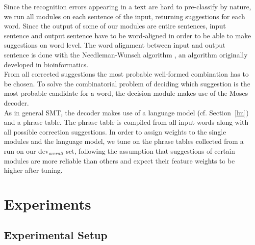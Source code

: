 \documentclass[11pt,letterpaper]{article}
\begin{document}
Since the recognition errors appearing in a text are hard to pre-classify by nature, we 
run all modules on each sentence of the input, returning suggestions for each word. 
Since the output of some of our modules are entire sentences, input sentence and output sentence 
have to be word-aligned in order to be able to make suggestions on word level. The word 
alignment between input and output sentence is done with the Needleman-Wunsch algorithm \cite{Needleman1970}, an algorithm originally developed in bioinformatics.\\
From all corrected suggestions the most probable well-formed combination has to be chosen. 
To solve the combinatorial problem of deciding which suggestion is the most probable candidate for a word, the decision module makes use of the Moses decoder.\\
As in general SMT, the decoder makes use of a language model (cf. Section~\ref{lm}) and a phrase table.
The phrase table is compiled from all input words along with all possible correction suggestions.
In order to assign weights to the single modules and the language model, we tune on the phrase tables 
collected from a run on our dev$_{overall}$ set, following the assumption that suggestions of certain modules are more reliable than others
and expect their feature weights to be higher after tuning. 


\section{Experiments}\label{sec:results}

\subsection{Experimental Setup}

\begin{table}
\caption{Werther specific parallel corpus of OCR text and corrected text showing the
number of tokens before and after post-correction along with WER and 
CER}
\label{specificdata}
\end{table}
\end{document}
